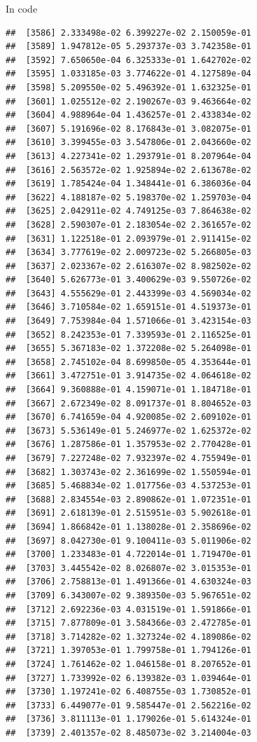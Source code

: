 \documentclass[ignorenonframetext,]{beamer}
\begin{document}
\begin{frame}[fragile]{In code}
\begin{verbatim}
##  [3586] 2.333498e-02 6.399227e-02 2.150059e-01
##  [3589] 1.947812e-05 5.293737e-03 3.742358e-01
##  [3592] 7.650650e-04 6.325333e-01 1.642702e-02
##  [3595] 1.033185e-03 3.774622e-01 4.127589e-04
##  [3598] 5.209550e-02 5.496392e-01 1.632325e-01
##  [3601] 1.025512e-02 2.190267e-03 9.463664e-02
##  [3604] 4.988964e-04 1.436257e-01 2.433834e-02
##  [3607] 5.191696e-02 8.176843e-01 3.082075e-01
##  [3610] 3.399455e-03 3.547806e-01 2.043660e-02
##  [3613] 4.227341e-02 1.293791e-01 8.207964e-04
##  [3616] 2.563572e-02 1.925894e-02 2.613678e-02
##  [3619] 1.785424e-04 1.348441e-01 6.386036e-04
##  [3622] 4.188187e-02 5.198370e-02 1.259703e-04
##  [3625] 2.042911e-02 4.749125e-03 7.864638e-02
##  [3628] 2.590307e-01 2.183054e-02 2.361657e-02
##  [3631] 1.122518e-01 2.093979e-01 2.911415e-02
##  [3634] 3.777619e-02 2.009723e-02 5.266805e-03
##  [3637] 2.023367e-02 2.616307e-02 8.982502e-02
##  [3640] 5.626773e-01 3.400629e-03 9.550726e-02
##  [3643] 4.555629e-01 2.443399e-03 4.569034e-02
##  [3646] 3.710584e-02 1.659151e-01 4.519373e-01
##  [3649] 7.753984e-04 1.571066e-01 3.423154e-03
##  [3652] 8.242353e-01 7.339593e-01 2.116525e-01
##  [3655] 5.367183e-02 1.372208e-02 5.264098e-01
##  [3658] 2.745102e-04 8.699850e-05 4.353644e-01
##  [3661] 3.472751e-01 3.914735e-02 4.064618e-02
##  [3664] 9.360888e-01 4.159071e-01 1.184718e-01
##  [3667] 2.672349e-02 8.091737e-01 8.804652e-03
##  [3670] 6.741659e-04 4.920085e-02 2.609102e-01
##  [3673] 5.536149e-01 5.246977e-02 1.625372e-02
##  [3676] 1.287586e-01 1.357953e-02 2.770428e-01
##  [3679] 7.227248e-02 7.932397e-02 4.755949e-01
##  [3682] 1.303743e-02 2.361699e-02 1.550594e-01
##  [3685] 5.468834e-02 1.017756e-03 4.537253e-01
##  [3688] 2.834554e-03 2.890862e-01 1.072351e-01
##  [3691] 2.618139e-01 2.515951e-03 5.902618e-01
##  [3694] 1.866842e-01 1.138028e-01 2.358696e-02
##  [3697] 8.042730e-01 9.100411e-03 5.011906e-02
##  [3700] 1.233483e-01 4.722014e-01 1.719470e-01
##  [3703] 3.445542e-02 8.026807e-02 3.015353e-01
##  [3706] 2.758813e-01 1.491366e-01 4.630324e-03
##  [3709] 6.343007e-02 9.389350e-03 5.967651e-02
##  [3712] 2.692236e-03 4.031519e-01 1.591866e-01
##  [3715] 7.877809e-01 3.584366e-03 2.472785e-01
##  [3718] 3.714282e-02 1.327324e-02 4.189086e-02
##  [3721] 1.397053e-01 1.799758e-01 1.794126e-01
##  [3724] 1.761462e-02 1.046158e-01 8.207652e-01
##  [3727] 1.733992e-02 6.139382e-03 1.039464e-01
##  [3730] 1.197241e-02 6.408755e-03 1.730852e-01
##  [3733] 6.449077e-01 9.585447e-01 2.562216e-02
##  [3736] 3.811113e-01 1.179026e-01 5.614324e-01
##  [3739] 2.401357e-02 8.485073e-02 3.214004e-03

\end{verbatim}
\end{frame}
\end{document}
